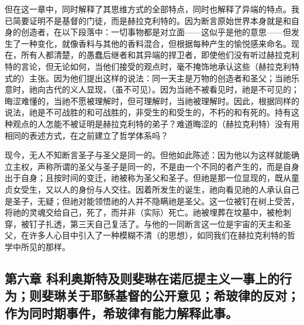 但在这一章中，同时解释了其思维方式的全部特点，同时也解释了异端的特点。我已简要证明不是基督的门徒，而是赫拉克利特的。因为断言原始世界本身就是和自身的创造者，在以下段落中：一切事物都是对立面——这似乎是他的意思——但发生了一种变化，就像香料与其他的香料混合，但根据每种产生的愉悦感来命名。现在，所有人都清楚，的愚蠢后继者和其异端的捍卫者，即使他们没有听过赫拉克利特的言论，但无论如何，当他们接受的观点时，毫不掩饰地承认这些（赫拉克利特式的）主张。因为他们提出这样的说法：同一天主是万物的创造者和圣父；当祂乐意时，祂向古代的义人显现，（虽不可见）。因为当祂不被看见时，祂是不可见的；晦涩难懂的，当祂不愿被理解时，但可理解时，当祂被理解时。因此，根据同样的说法，祂是不可战胜的和可战胜的，非受生的和受生的，不朽的和有死的。持有这种观点的人怎能不被证明是赫拉克利特的弟子？难道晦涩的（赫拉克利特）没有用相同的表述方式，在之前建立了哲学体系吗？\par

现今，无人不知断言圣子与圣父是同一的。但他如此陈述：因为他以为这样就能确立主权，声称所谓的圣父与圣子是同一的，不是由一个不同的者产生的，而是自身出于自身；且按时间的变迁，祂被称为圣父和圣子。但祂是那一位显现的，既从童贞女受生，又以人的身份与人交往。因着所发生的诞生，祂向看见祂的人承认自己是圣子，无疑；但祂对能领悟祂的人并不隐瞒祂是圣父。这一位被钉在树上受苦，将祂的灵魂交给自己，死了，而并非（实际）死亡。祂被埋葬在坟墓中，被枪刺穿，被钉子扎透，第三天自己复活了。与他的一同断言这一位是宇宙的天主和圣父，在许多人心目中引入了一种模糊不清（的思想），如同我们在赫拉克利特的哲学中所见的那样。\par


\subsection{第六章 科利奥斯特及则斐琳在诺厄提主义一事上的行为；则斐琳关于耶稣基督的公开意见；希玻律的反对；作为同时期事件，希玻律有能力解释此事。}

